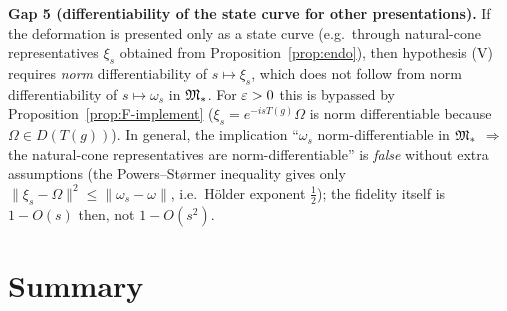 \documentclass[11pt]{article}
\newcommand{\Om}{\Omega}
\newcommand{\norm}[1]{\lVert #1\rVert}
\begin{document}
\begin{verdictgap}
\textbf{Gap 5 (differentiability of the state curve for other presentations).}  If the deformation is presented only
as a state curve (e.g.\ through natural-cone representatives $\xi_s$ obtained from Proposition~\ref{prop:endo}), then
hypothesis (V) requires \emph{norm} differentiability of $s\mapsto\xi_s$, which does not follow from norm
differentiability of $s\mapsto\omega_s$ in $\mathfrak M_*$.  For $\varepsilon>0$ this is bypassed by
Proposition~\ref{prop:F-implement} ($\xi_s=e^{-isT(g)}\Om$ is norm differentiable because $\Om\in D(T(g))$).
In general, the implication ``$\omega_s$ norm-differentiable in $\mathfrak M_*$ $\Rightarrow$ the natural-cone
representatives are norm-differentiable'' is \emph{false} without extra assumptions
(the Powers--St\o rmer inequality gives only $\norm{\xi_s-\Om}^2\le\norm{\omega_s-\omega}$, i.e.\ H\"older
exponent $\tfrac12$); the fidelity itself is $1-O(s)$ then, not $1-O(s^2)$.
\end{verdictgap}

\section{Summary}\label{sec:summary}
\end{document}
